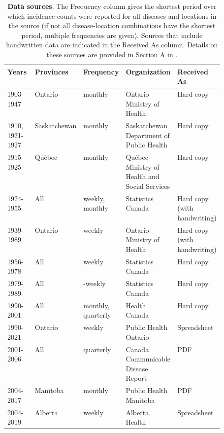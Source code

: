 \documentclass[10pt,letterpaper]{article}
\begin{document}
\begin{table}[!ht]
  \centering
  \caption{\textbf{Data sources}. The Frequency column gives the shortest period over which incidence counts were reported for all diseases and locations in the source (if not all disease-location combinations have the shortest period, multiple frequencies are given). Sources that include handwritten data are indicated in the Received As column. Details on these sources are provided in Section A in .} 
  \begin{tabular}{ll>{\raggedright\arraybackslash}p{0.11\linewidth}>{\raggedright\arraybackslash}p{0.2\linewidth}>{\raggedright\arraybackslash}p{0.2\linewidth}}  
Years & Provinces & Frequency & Organization & Received As \\ 
  \hline
1903-1947 & Ontario & monthly & Ontario Ministry of Health & Hard copy \\ 
  1910, 1921-1927 & Saskatchewan & monthly & Saskatchewan Department of Public Health & Hard copy \\ 
  1915-1925 & Qu\'{e}bec & monthly & Qu\'{e}bec Ministry of Health and Social Services & Hard copy \\ 
  1924-1955 & All & weekly, monthly & Statistics Canada & Hard copy (with handwriting) \\ 
  1939-1989 & Ontario & weekly & Ontario Ministry of Health & Hard copy (with handwriting) \\ 
  1956-1978 & All & weekly & Statistics Canada & Hard copy \\ 
  1979-1989 & All & 4-weekly & Statistics Canada & Hard copy \\ 
  1990-2001 & All & monthly, quarterly & Health Canada & Hard copy \\ 
  1990-2021 & Ontario & weekly & Public Health Ontario & Spreadsheet \\ 
  2001-2006 & All & quarterly & Canada Communicable Disease Report & PDF \\ 
  2004-2017 & Manitoba & monthly & Public Health Manitoba & PDF \\ 
  2004-2019 & Alberta & weekly & Alberta Health & Spreadsheet \\ 
   \hline
\end{tabular}
\label{tab:sources-table}
\end{table}
\end{document}
